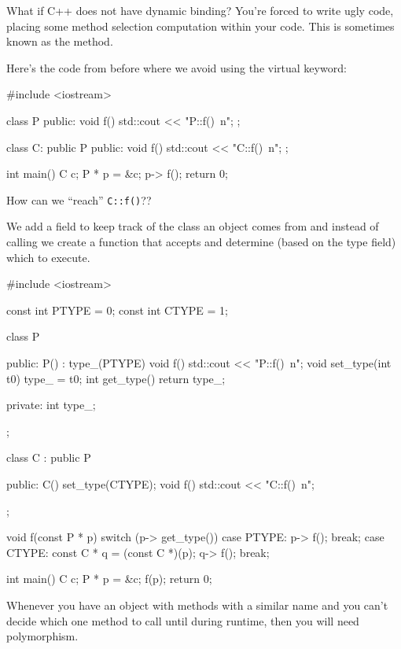 What if C++ does not have dynamic binding? You're forced to write ugly code, placing some method selection computation within your code. This is sometimes known as the  method.

Here's the code from before where we avoid using the virtual keyword:

\begin{console}
#include <iostream>

class P
{
public:
     void f() { std::cout << "P::f()\ n"; }
};

class C: public P
{
public:
     void f() { std::cout << "C::f()\ n"; }
};

int main()
{   
    C c;
    P * p = &c;
    p-> f();
    return 0;
}
\end{console}

How can we ``reach'' \texttt{C::f()}??

We add a field to keep track of the class an object comes from and instead of calling we create a function that accepts and determine (based on the type field) which to execute.

\begin{console}
#include <iostream>

const int PTYPE = 0;
const int CTYPE = 1;

class P
{
public:
     P() : type_(PTYPE) {}
     void f() { std::cout << "P::f()\ n"; }
     void set_type(int t0) { type_ = t0; }
     int get_type() { return type_; }
     
private:
     int type_;

};

class C : public P
{
public:
     C() { set_type(CTYPE); }
     void f() { std::cout << "C::f()\ n"; }

};

void f(const P * p)
{    
     switch (p-> get_type())
     {    
          case PTYPE:
               p-> f();
               break;
          case CTYPE:
               const C * q = (const C *)(p);
               q-> f();
               break;
     }
}

int main()
{   
    C c;
    P * p = &c;
    f(p);
    return 0;
}
\end{console}

\newpage{}

Whenever you have an object with methods with a similar name and you can't decide which one method to call until during runtime, then you will need polymorphism.


